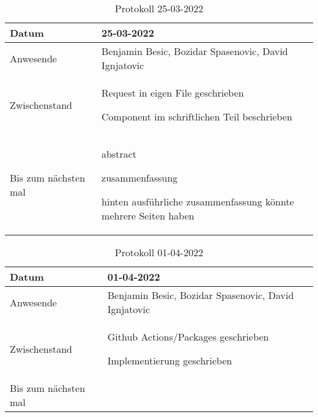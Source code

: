 \begin{table}
    \begin{tabular}{ |p{3cm}|p{10cm}|   }
        \hline
        Datum & 25-03-2022\\
        \hline
        Anwesende & Benjamin Besic, Bozidar Spasenovic, David Ignjatovic\\

        \hline
        Zwischenstand& 

        Request in eigen File geschrieben
    
        Component im schriftlichen Teil beschrieben
    
    \\
        \hline
        Bis zum nächsten mal & 

        abstract
    
        zusammenfassung
    
        hinten ausführliche zusammenfassung könnte mehrere Seiten haben
    
     \\
        \hline
    \end{tabular}
    \caption{Protokoll 25-03-2022}
    \label{tab:my_label}
\end{table}
\begin{table}
    \begin{tabular}{ |p{3cm}|p{10cm}|   }
        \hline
        Datum & 01-04-2022\\
        \hline
        Anwesende & Benjamin Besic, Bozidar Spasenovic, David Ignjatovic\\

        \hline
        Zwischenstand& 

        Github Actions/Packages geschrieben
    
        Implementierung geschrieben
    
    \\
        \hline
        Bis zum nächsten mal &  
    
    \\
        \hline
    \end{tabular}
    \caption{Protokoll 01-04-2022}
    \label{tab:my_label}
\end{table}